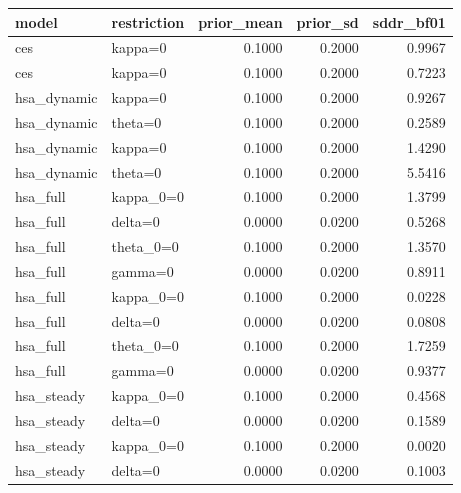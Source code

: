 \begin{tabular}{llrrr}
\toprule
model & restriction & prior\_mean & prior\_sd & sddr\_bf01 \\
\midrule
ces & kappa=0 & 0.1000 & 0.2000 & 0.9967 \\
ces & kappa=0 & 0.1000 & 0.2000 & 0.7223 \\
hsa\_dynamic & kappa=0 & 0.1000 & 0.2000 & 0.9267 \\
hsa\_dynamic & theta=0 & 0.1000 & 0.2000 & 0.2589 \\
hsa\_dynamic & kappa=0 & 0.1000 & 0.2000 & 1.4290 \\
hsa\_dynamic & theta=0 & 0.1000 & 0.2000 & 5.5416 \\
hsa\_full & kappa\_0=0 & 0.1000 & 0.2000 & 1.3799 \\
hsa\_full & delta=0 & 0.0000 & 0.0200 & 0.5268 \\
hsa\_full & theta\_0=0 & 0.1000 & 0.2000 & 1.3570 \\
hsa\_full & gamma=0 & 0.0000 & 0.0200 & 0.8911 \\
hsa\_full & kappa\_0=0 & 0.1000 & 0.2000 & 0.0228 \\
hsa\_full & delta=0 & 0.0000 & 0.0200 & 0.0808 \\
hsa\_full & theta\_0=0 & 0.1000 & 0.2000 & 1.7259 \\
hsa\_full & gamma=0 & 0.0000 & 0.0200 & 0.9377 \\
hsa\_steady & kappa\_0=0 & 0.1000 & 0.2000 & 0.4568 \\
hsa\_steady & delta=0 & 0.0000 & 0.0200 & 0.1589 \\
hsa\_steady & kappa\_0=0 & 0.1000 & 0.2000 & 0.0020 \\
hsa\_steady & delta=0 & 0.0000 & 0.0200 & 0.1003 \\
\bottomrule
\end{tabular}
